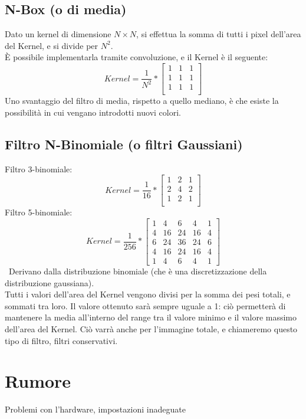 \documentclass{report}
\begin{document}
	\subsection{N-Box (o di media)}
	Dato un kernel di dimensione $N \times N$, si effettua la somma di tutti i pixel dell'area del Kernel, e si divide per $N^2$.\\
	È possibile implementarla tramite convoluzione, e il Kernel è il seguente:
	$$
	Kernel = \frac{1}{N^2} *
	\begin{bmatrix}
		1 & 1 & 1 \\
		1 & 1 & 1 \\
		1 & 1 & 1 \\
	\end{bmatrix}
	$$
	Uno svantaggio del filtro di media, rispetto a quello mediano, è che esiste la possibilità in cui vengano introdotti nuovi colori.
		
	\newpage
	\subsection{Filtro N-Binomiale (o filtri Gaussiani)}
	Filtro 3-binomiale:
	$$
	Kernel = \frac{1}{16} *
	\begin{bmatrix}
		1 & 2 & 1 \\
		2 & 4 & 2 \\
		1 & 2 & 1 \\
	\end{bmatrix}
	$$
	Filtro 5-binomiale:
	$$
	Kernel = \frac{1}{256} *
	\begin{bmatrix}
		1 & 4  & 6  & 4  & 1 \\
		4 & 16 & 24 & 16 & 4 \\
		6 & 24 & 36 & 24 & 6 \\
		4 & 16 & 24 & 16 & 4 \\
		1 & 4  & 6  & 4  & 1 
	\end{bmatrix}
	$$
	\
	Derivano dalla distribuzione binomiale (che è una discretizzazione della distribuzione gaussiana).\\
	Tutti i valori dell'area del Kernel vengono divisi per la somma dei pesi totali, e sommati tra loro. Il valore ottenuto sarà sempre uguale a 1: ciò permetterà di mantenere la media all'interno del range tra il valore minimo e il valore massimo dell'area del Kernel. Ciò varrà anche per l'immagine totale, e chiameremo questo tipo di filtro, filtri conservativi.
		
	\section{Rumore}
	Problemi con l'hardware, impostazioni inadeguate
\end{document}

